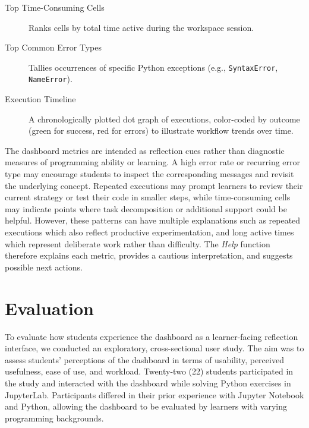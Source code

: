 \documentclass[sigconf]{acmart}
\begin{document}
\begin{description}
    \item[Top Time-Consuming Cells] Ranks cells by total time active during the workspace session.

    \item[Top Common Error Types] Tallies occurrences of specific Python exceptions (e.g., \texttt{SyntaxError}, \texttt{NameError}).

    \item[Execution Timeline] A chronologically plotted dot graph of executions, color-coded by outcome (green for success, red for errors) to illustrate workflow trends over time.
\end{description}

The dashboard metrics are intended as reflection cues rather than diagnostic measures of programming ability or learning. A high error rate or recurring error type may encourage students to inspect the corresponding messages and revisit the underlying concept. Repeated executions may prompt learners to review their current strategy or test their code in smaller steps, while time-consuming cells may indicate points where task decomposition or additional support could be helpful. However, these patterns can have multiple explanations such as repeated executions which also reflect productive experimentation, and long active times which represent deliberate work rather than difficulty. The \emph{Help} function therefore explains each metric, provides a cautious interpretation, and suggests possible next actions.

\section{Evaluation}

To evaluate how students experience the dashboard as a learner-facing reflection interface, we conducted an exploratory, cross-sectional user study. The aim was to assess students' perceptions of the dashboard in terms of usability, perceived usefulness, ease of use, and workload. Twenty-two (22) students participated in the study and interacted with the dashboard while solving Python exercises in JupyterLab. Participants differed in their prior experience with Jupyter Notebook and Python, allowing the dashboard to be evaluated by learners with varying programming backgrounds.
\end{document}

